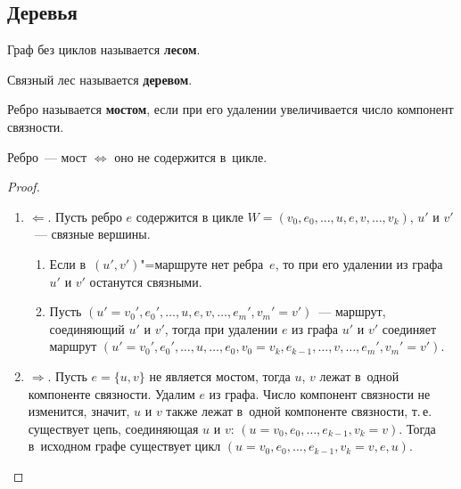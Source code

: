 \subsection{Деревья}
 Граф без циклов называется \textbf{лесом}.

 Связный лес называется \textbf{деревом}.

 Ребро называется \textbf{мостом}, если при его удалении увеличивается число компонент связности.

\begin{statement}
\label{st:criterion_of_bridge_in_graph}
Ребро~--- мост $\Leftrightarrow$ оно не содержится в~цикле.
\end{statement}
\begin{proof}
\begin{enumerate}
	\item $\Leftarrow$.
	Пусть ребро $e$ содержится в цикле $W = (v_0, e_0, \ldots, u, e, v, \ldots, v_k)$, $u'$ и $v'$~--- связные вершины.
	\begin{enumerate}
		\item Если в~$(u', v')$"=маршруте нет ребра~$e$, то при его удалении из графа $u'$ и $v'$ останутся связными.
		\item Пусть $(u' = v_0', e_0', \ldots, u, e, v, \ldots, e_m', v_m' = v')$~--- маршрут, соединяющий $u'$ и $v'$, тогда при удалении $e$ из графа $u'$ и $v'$ соединяет маршрут
		$(u' = v_0', e_0', \ldots, u, \ldots, e_0, v_0 = v_k, e_{k-1}, \ldots, v, \ldots, e_m', v_m' = v')$.
	\end{enumerate}
	
	\item $\Rightarrow$.
	Пусть $e = \{ u, v \}$ не является мостом, тогда $u$, $v$ лежат в~одной компоненте связности.
	Удалим $e$ из графа.
	Число компонент связности не изменится, значит, $u$ и $v$ также лежат в~одной компоненте связности, т.\,е. существует цепь, соединяющая $u$ и $v$: $(u = v_0, e_0, \ldots, e_{k-1}, v_k = v)$.
	Тогда в~исходном графе существует цикл $(u = v_0, e_0, \ldots, e_{k-1}, v_k = v, e, u)$.
\end{enumerate}
\end{proof}

